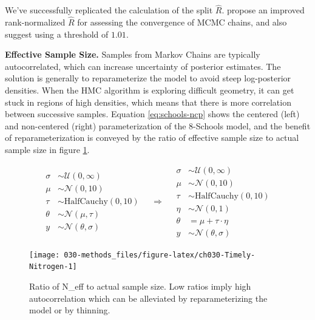 \documentclass[11pt, oneside, openany]{scrbook}
\begin{document}

We've successfully replicated the calculation of the split \(\hat{R}\). \citet{vehtari2020rank} propose an improved rank-normalized \(\hat{R}\) for assessing the convergence of MCMC chains, and also suggest using a threshold of \(1.01\).

\textbf{Effective Sample Size.} Samples from Markov Chains are typically autocorrelated, which can increase uncertainty of posterior estimates. The solution is generally to reparameterize the model to avoid steep log-posterior densities. When the HMC algorithm is exploring difficult geometry, it can get stuck in regions of high densities, which means that there is more correlation between successive samples. Equation \eqref{eq:schools-ncp} shows the centered (left) and non-centered (right) parameterization of the 8-Schools model, and the benefit of reparameterization is conveyed by the ratio of effective sample size to actual sample size in figure \ref{fig:ch030-Timely-Nitrogen}.


\begin{equation}
  \begin{split}
    \sigma &\sim \mathcal{U}(0, \infty) \\
    \mu &\sim \mathcal{N}(0, 10) \\
    \tau &\sim \mathrm{HalfCauchy}(0, 10) \\
    \theta &\sim \mathcal{N}(\mu, \tau) \\
    y &\sim \mathcal{N}(\theta, \sigma)
  \end{split}
\quad \Longrightarrow \quad
  \begin{split}
    \sigma &\sim \mathcal{U}(0, \infty) \\
    \mu &\sim \mathcal{N}(0, 10) \\
    \tau &\sim \mathrm{HalfCauchy}(0, 10) \\
    \eta &\sim \mathcal{N}(0, 1) \\
    \theta &= \mu + \tau \cdot \eta \\
    y &\sim \mathcal{N}(\theta, \sigma)
  \end{split}
\label{eq:schools-ncp}
\end{equation}

\begin{figure}

{\centering \texttt{[image: 030-methods\_files/figure-latex/ch030-Timely-Nitrogen-1]} 

}

\caption{Ratio of N\_eff to actual sample size. Low ratios imply high autocorrelation which can be alleviated by reparameterizing the model or by thinning.}\label{fig:ch030-Timely-Nitrogen}
\end{figure}
\end{document}
